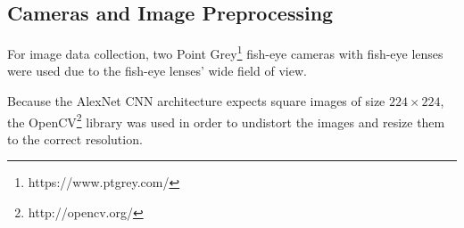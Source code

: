 \documentclass[letterpaper, 12 pt, conference]{ieeeconf}  %
\begin{document}
\subsection{Cameras and Image Preprocessing}

For image data collection, two Point Grey\footnote{https://www.ptgrey.com/} fish-eye cameras with fish-eye lenses were used due to the fish-eye lenses' wide field of view. 
\par
Because the AlexNet CNN architecture expects square images of size $224\times 224$, the OpenCV\footnote{http://opencv.org/} library was used in order to undistort the images and resize them to the correct resolution. 









\end{document}
